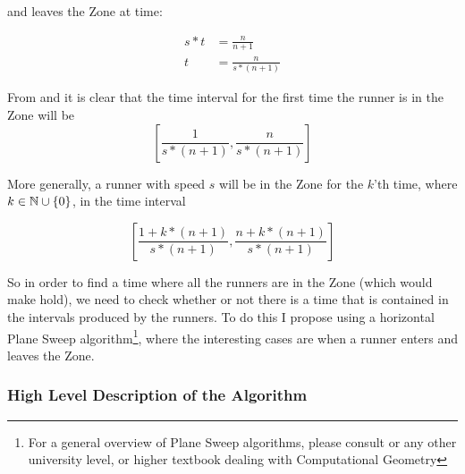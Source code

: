 and leaves the Zone at time:

\begin{equation}
\label{eqa:speedTwo}
\begin{split}
s * t &= \frac{n}{n+1} \\
t &= \frac{n}{s * (n+1)}
\end{split}
\end{equation}

From  and  it is clear that the time interval for the first time the runner is in the Zone will be 
\begin{displaymath}
\left[\frac{1}{s * (n+1)}, \frac{n}{s * (n+1)}\right]
\end{displaymath}

More generally, a runner with speed $s$ will be in the Zone for the $k$'th time, where $k \in \mathbb{N} \cup \{0\}$, in the time interval 

\begin{equation}
\label{eqa:genericZone}
\left[\frac{1 + k * (n+1)}{s * (n+1)}, \frac{n + k * (n+1)}{s * (n+1)}\right] 
\end{equation}

So in order to find a time where all the runners are in the Zone (which would make  hold), we need to check whether or not there is a time that is contained in the intervals produced by the runners. To do this I propose using a horizontal Plane Sweep algorithm\footnote{For a general overview of Plane Sweep algorithms, please consult \cite{citeulike:3347056} or any other university level, or higher textbook dealing with Computational Geometry}, where the interesting cases are when a runner enters and leaves the Zone. 

\subsubsection{High Level Description of the Algorithm}

